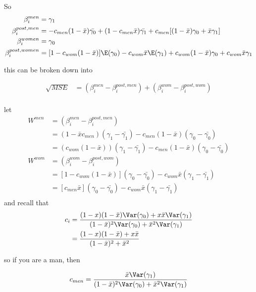 So 
\begin{align*}
	\beta_i^{men} &= \gamma_1 \\
	\beta_i^{post,men} &= -c_{men} ( 1- \bar{x}) \bar{\gamma_0} + (1 - c_{men}\bar{x}) \bar{\gamma_1} + c_{men} [ (1-\bar{x}) \gamma_0 + \bar{x}\gamma_1] \\
	\beta_i^{women} &= \gamma_0 \\
	\beta_i^{post,women} &= [ 1 - c_{wom}(1-\bar{x}) ]\E(\gamma_0) - c_{wom} \bar{x} \E(\gamma_1) + c_{wom} (1- \bar{x}) \gamma_0 + c_{wom} \bar{x} \gamma_1 \\
\end{align*} 

this can be broken down into

\begin{align*}
	\sqrt{ MSE } &= (\beta_i^{men} - \beta_i^{post, men} )+ (\beta_i^{wom} - \beta_i^{post, wom}) \\
\end{align*} 

let 
 \begin{align*}
	 W^{men} &=  (\beta_i^{men} - \beta_i^{post, men}) \\
			&= (1 - \bar{x} c_{men}) (\gamma_1 - \bar{\gamma_1}) - c_{men} ( 1 - \bar{x}) (\gamma_0 - \bar{\gamma_0}) \\
			&= (c_{wom} (1 - \bar{x})) (\gamma_1 - \bar{\gamma_1}) - c_{men} ( 1 - \bar{x}) (\gamma_0 - \bar{\gamma_0}) \\
	 W^{wom} &=  (\beta_i^{wom} - \beta_i^{post, wom}) \\
			 &= [ 1 - c_{wom}(1 - \bar{x}) ] (\gamma_0 - \bar{\gamma_0}) - c_{wom} \bar{x} (\gamma_1 - \bar{\gamma_1}) \\
			 &= [ c_{men} \bar{x}] (\gamma_0 - \bar{\gamma_0}) - c_{wom} \bar{x} (\gamma_1 - \bar{\gamma_1}) \\
\end{align*} 
and recall that
\begin{align*}
	c_{i} &= \frac{(1-x)(1-\bar{x})\Var(\gamma_0) + x\bar{x}\Var(\gamma_1)}{(1-\bar{x})^2\Var(\gamma_0) + \bar{x}^2\Var(\gamma_1)} \\
		  &= \frac{(1-x)(1-\bar{x}) + x\bar{x}}{(1-\bar{x})^2 + \bar{x}^2} 
\end{align*}

so if you are a man, then 

\begin{align*}
	c_{men} =  \frac{\bar{x}\Var(\gamma_1)}{(1-\bar{x})^2\Var(\gamma_0) + \bar{x}^2\Var(\gamma_1)}
\end{align*}

